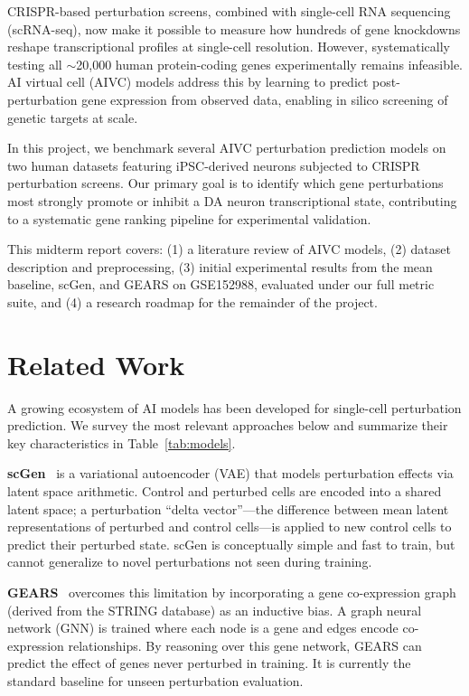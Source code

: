 \documentclass[11pt,letterpaper]{article}
\begin{document}
CRISPR-based perturbation screens, combined with single-cell RNA sequencing (scRNA-seq), now
make it possible to measure how hundreds of gene knockdowns reshape transcriptional profiles at
single-cell resolution. However, systematically testing all $\sim$20,000 human protein-coding
genes experimentally remains infeasible. AI virtual cell (AIVC) models address this by learning
to predict post-perturbation gene expression from observed data, enabling in silico screening of
genetic targets at scale.

In this project, we benchmark several AIVC perturbation prediction models on two human datasets
featuring iPSC-derived neurons subjected to CRISPR perturbation screens. Our primary goal is to
identify which gene perturbations most strongly promote or inhibit a DA neuron transcriptional
state, contributing to a systematic gene ranking pipeline for experimental validation.

This midterm report covers: (1) a literature review of AIVC models, (2) dataset description and
preprocessing, (3) initial experimental results from the mean baseline, scGen, and GEARS on
GSE152988, evaluated under our full metric suite, and (4) a research roadmap for the remainder
of the project.

\section{Related Work}

A growing ecosystem of AI models has been developed for single-cell perturbation prediction.
We survey the most relevant approaches below and summarize their key characteristics in
Table~\ref{tab:models}.

\textbf{scGen}~\cite{lopez2018} is a variational autoencoder (VAE) that models perturbation
effects via latent space arithmetic. Control and perturbed cells are encoded into a shared latent
space; a perturbation ``delta vector''---the difference between mean latent representations of
perturbed and control cells---is applied to new control cells to predict their perturbed state.
scGen is conceptually simple and fast to train, but cannot generalize to novel perturbations not
seen during training.

\textbf{GEARS}~\cite{roohani2023} overcomes this limitation by incorporating a gene co-expression
graph (derived from the STRING database) as an inductive bias. A graph neural network (GNN) is
trained where each node is a gene and edges encode co-expression relationships. By reasoning over
this gene network, GEARS can predict the effect of genes never perturbed in training. It is
currently the standard baseline for unseen perturbation evaluation.
\end{document}
